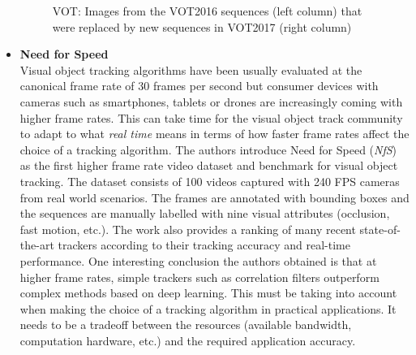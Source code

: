 \begin{itemize}
\begin{figure}[H]
\begin{center}
\caption{VOT: Images from the VOT2016 sequences (left column) that were replaced by new sequences in VOT2017 (right column) ~\cite{kristan2017visual}}
\label{fig:vot}
\end{center}
\end{figure}
\item \textbf{Need for Speed} \cite{kiani2017need}\\
Visual object tracking algorithms have been usually evaluated at the canonical frame rate of 30 frames per second but consumer devices with cameras such as smartphones, tablets or drones are increasingly coming with higher frame rates. This can take time for the visual object track community to adapt to what \textit{real time} means in terms of how faster frame rates affect the choice of a tracking algorithm. The authors introduce Need for Speed (\textit{NfS}) as the first higher frame rate video dataset and benchmark for visual object tracking. The dataset consists of 100 videos captured with 240 FPS cameras from real world scenarios. The frames are annotated with bounding boxes and the sequences are manually labelled with nine visual attributes (occlusion, fast motion, etc.). The work also provides a ranking of many recent state-of-the-art trackers according to their tracking accuracy and real-time performance. One interesting conclusion the authors obtained is that at higher frame rates, simple trackers such as correlation filters outperform complex methods based on deep learning. This must be taking into account when making the choice of a tracking algorithm in practical applications. It needs to be a tradeoff between the resources (available bandwidth, computation hardware, etc.) and the required application accuracy.
\end{itemize}

